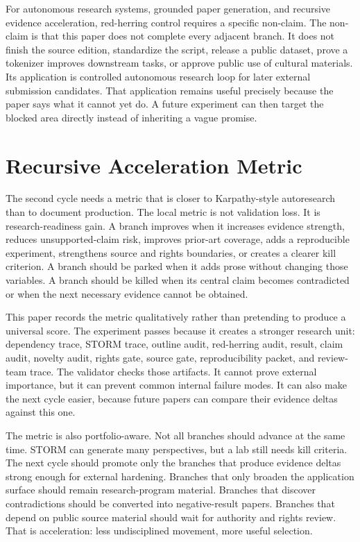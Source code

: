 \documentclass[sigconf,nonacm]{acmart}
\begin{document}
For autonomous research systems, grounded paper generation, and recursive evidence acceleration, red-herring control requires a specific non-claim. The non-claim is
that this paper does not complete every adjacent branch. It does not finish the
source edition, standardize the script, release a public dataset, prove a
tokenizer improves downstream tasks, or approve public use of cultural
materials. Its application is controlled autonomous research loop for later external submission candidates. That application remains useful
precisely because the paper says what it cannot yet do. A future experiment can
then target the blocked area directly instead of inheriting a vague promise.

\section{Recursive Acceleration Metric}
The second cycle needs a metric that is closer to Karpathy-style autoresearch
than to document production. The local metric is not validation loss. It is
research-readiness gain. A branch improves when it increases evidence strength,
reduces unsupported-claim risk, improves prior-art coverage, adds a reproducible
experiment, strengthens source and rights boundaries, or creates a clearer kill
criterion. A branch should be parked when it adds prose without changing those
variables. A branch should be killed when its central claim becomes contradicted
or when the next necessary evidence cannot be obtained.

This paper records the metric qualitatively rather than pretending to produce a
universal score. The experiment passes because it creates a stronger research
unit: dependency trace, STORM trace, outline audit, red-herring audit, result,
claim audit, novelty audit, rights gate, source gate, reproducibility packet,
and review-team trace. The validator checks those artifacts. It cannot prove
external importance, but it can prevent common internal failure modes. It can
also make the next cycle easier, because future papers can compare their
evidence deltas against this one.

The metric is also portfolio-aware. Not all branches should advance at the same
time. STORM can generate many perspectives, but a lab still needs kill criteria.
The next cycle should promote only the branches that produce evidence deltas
strong enough for external hardening. Branches that only broaden the application
surface should remain research-program material. Branches that discover
contradictions should be converted into negative-result papers. Branches that
depend on public source material should wait for authority and rights review.
That is acceleration: less undisciplined movement, more useful selection.
\end{document}

